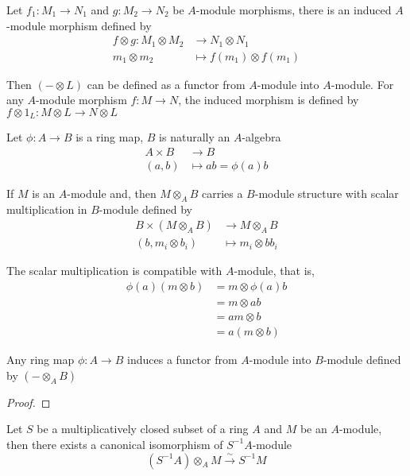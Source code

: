 \begin{remark}
	Let $f_1: M_1 \to N_1$ and $g: M_2 \to N_2$ be $A$-module morphisms, there is an induced $A$-module morphism defined by
	\begin{align*}
		f \otimes g: M_1 \otimes M_2 &\to N_1 \otimes N_1 \\
							m_1 \otimes m_2 &\mapsto f(m_1) \otimes f(m_1)
 	\end{align*}
	
	Then $(- \otimes L)$ can be defined as a functor from $A$-module into $A$-module. For any $A$-module morphism $f: M \to N$, the induced morphism is defined by $f \otimes 1_L: M \otimes L \to N \otimes L$
\end{remark}

\begin{remark}
	Let $\phi: A \to B$ is a ring map, $B$ is naturally an $A$-algebra
	\begin{align*}
				A \times B &\to B \\
					(a, b) &\mapsto a b = \phi(a) b
	\end{align*}

	If $M$ is an $A$-module and, then $M \otimes_A B$ carries a $B$-module structure with scalar multiplication in $B$-module defined by
	\begin{align*}
		B \times (M \otimes_A B) &\to M \otimes_A B \\
		(b, m_i \otimes b_i) &\mapsto m_i \otimes b b_i
	\end{align*}
	
	The scalar multiplication is compatible with $A$-module, that is,
	\begin{align*}
		\phi(a) (m \otimes b) 
		&= m \otimes \phi(a) b \\
		&= m \otimes ab \\
		&= am \otimes b \\
		&= a(m \otimes b)
	\end{align*}
	
	Any ring map $\phi: A \to B$ induces a functor from $A$-module into $B$-module defined by $(- \otimes_A B)$
\end{remark}

\begin{proof}
\end{proof}

\begin{proposition}
	Let $S$ be a multiplicatively closed subset of a ring $A$ and $M$ be an $A$-module, then there exists a canonical isomorphism of $S^{-1} A$-module
	$$
		(S^{-1} A) \otimes_A M \xrightarrow{\sim} S^{-1} M
	$$
\end{proposition}

